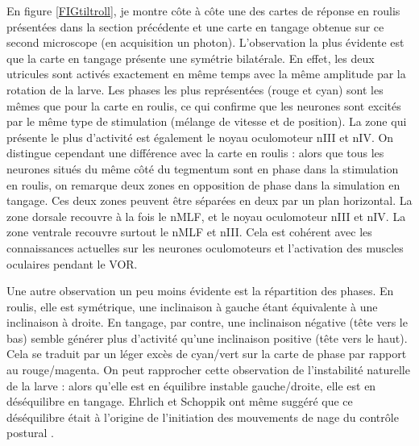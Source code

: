 
En figure \ref{FIGtiltroll}, je montre côte à côte une des cartes de réponse en roulis présentées dans la section précédente et une carte en tangage obtenue sur ce second microscope (en acquisition un photon). L'observation la plus évidente est que la carte en tangage présente une symétrie bilatérale. En effet, les deux utricules sont activés exactement en même temps avec la même amplitude par la rotation de la larve. Les phases les plus représentées (rouge et cyan) sont les mêmes que pour la carte en roulis, ce qui confirme que les neurones sont excités par le même type de stimulation (mélange de vitesse et de position). La zone qui présente le plus d'activité est également le noyau oculomoteur nIII et nIV. On distingue cependant une différence avec la carte en roulis : alors que tous les neurones situés du même côté du tegmentum sont en phase dans la stimulation en roulis, on remarque deux zones en opposition de phase dans la simulation en tangage. Ces deux zones peuvent être séparées en deux par un plan horizontal. La zone dorsale recouvre à la fois le nMLF, et le noyau oculomoteur nIII et nIV. La zone ventrale recouvre surtout le nMLF et nIII. Cela est cohérent avec les connaissances actuelles sur les neurones oculomoteurs \cite{schoppik_gaze-stabilizing_2017} et l'activation des muscles oculaires pendant le VOR.




Une autre observation un peu moins évidente est la répartition des phases. En roulis, elle est symétrique, une inclinaison à gauche étant équivalente à une inclinaison à droite. En tangage, par contre, une inclinaison négative (tête vers le bas) semble générer plus d'activité qu'une inclinaison positive (tête vers le haut). Cela se traduit par un léger excès de cyan/vert sur la carte de phase par rapport au rouge/magenta. On peut rapprocher cette observation de l'instabilité naturelle de la larve : alors qu'elle est en équilibre instable gauche/droite, elle est en déséquilibre en tangage. Ehrlich et Schoppik ont même suggéré que ce déséquilibre était à l'origine de l'initiation des mouvements de nage du contrôle postural \cite{ehrlich_control_2017}.

